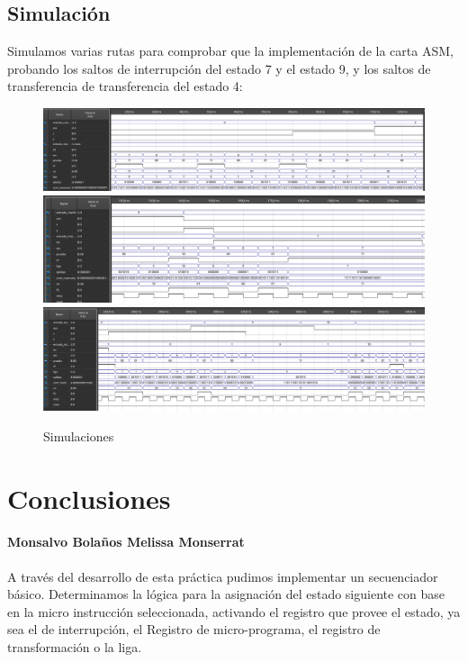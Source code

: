 \documentclass[table]{scrartcl}
\begin{document}
\subsection{Simulación}\label{sec:simulacion}
Simulamos varias rutas para comprobar que la implementación de la
carta ASM, probando los saltos de interrupción del estado 7 y el estado 9, y los
saltos de transferencia de transferencia del estado 4:
\begin{figure}[H]
  \centering
  \includegraphics[width=\textwidth]{./img/sim1}
  \includegraphics[width=\textwidth]{./img/sim2}\\
  \includegraphics[width=\textwidth]{./img/sim3}\\
  \caption{Simulaciones}\label{fig:sim}
\end{figure}
\newpage{}

\section{Conclusiones}
\label{sec:conclusiones}

\paragraph{Monsalvo Bolaños Melissa Monserrat}

A través del desarrollo de esta práctica pudimos implementar un secuenciador
básico. Determinamos la lógica para la asignación del estado siguiente con base
en la micro instrucción seleccionada, activando el registro que provee el
estado, ya sea el de interrupción, el Registro de micro-programa, el registro de
transformación o la liga.
\end{document}
